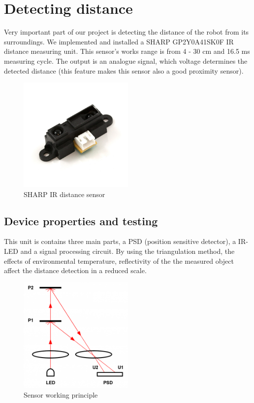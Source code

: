 \chapter{Detecting distance}
\label{chap:Detecting}
Very important part of our project is detecting the distance of the robot from its surroundings. We implemented and installed a SHARP GP2Y0A41SK0F IR distance measuring unit. This sensor's works range is from 4 - 30 cm and 16.5 ms measuring cycle. The output is an analogue signal, which voltage determines the detected distance (this feature makes this sensor also a good proximity sensor). 

\begin{figure}[!ht]
	\centering
	\includegraphics[width=0.5\textwidth]{figures/sensor}
	\caption{SHARP IR distance sensor}
	\label{fig:sensor}
\end{figure}
\section{Device properties and testing}
This unit is contains three main parts, a PSD (position sensitive detector), a IR-LED and a signal processing circuit. By using the triangulation method, the effects of environmental temperature, reflectivity of the the measured object affect the distance detection in a reduced scale. 

\begin{figure}[!ht]
	\centering
	\includegraphics[width=0.5\textwidth]{figures/sensor_principle}
	\caption{Sensor working principle}
	\label{fig:sensor}
\end{figure}

